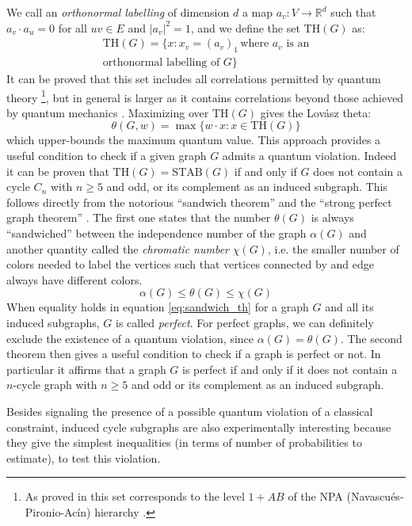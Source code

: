 \documentclass[letterpaper]{article}
\newcommand{\Real}{\mathbb{R}}
\newcommand{\STAB}{\mathrm{STAB}}
\renewcommand{\TH}{\mathrm{TH}}
\begin{document}
We call an \emph{orthonormal labelling} of dimension $d$ a map
$a_v:V \rightarrow \Real^d$ such that $a_v \cdot a_u = 0$ for all $uv \in E$ and
$|a_v|^2 = 1$, and we define the set $\TH(G)$ as:
\begin{multline}
    \TH(G) = \{x: x_v = (a_v)_1 \, \text{where $a_v$ is an} \\ \text{orthonormal labelling of $G$}\}
    \label{eq:thbody}
\end{multline}
It can be proved that this set includes all correlations permitted by quantum
theory \footnote{As proved in \cite{acin2015} this set corresponds to the level
$1+AB$ of the NPA (Navascués-Pironio-Acín) hierarchy \cite{npa2008}.}, 
but in general is larger as it contains correlations beyond those achieved by quantum
mechanics \cite{almostquantum2015}.
Maximizing over $\TH(G)$ gives the Lovász theta:
\begin{equation}
    \theta(G,w) = \max \{w\cdot x : x \in \TH(G)\}
    \label{eq:lovasztheta}
\end{equation}
which upper-bounds the maximum quantum value.
This approach provides a useful condition to check if a given graph $G$ admits a
quantum violation. Indeed it can be proven that $\TH(G) = \STAB(G)$ if and only
if $G$ does not contain a cycle $C_n$ with $n \ge 5$ and odd, or its complement
as an induced subgraph. 
This follows directly from the notorious ``sandwich theorem''\cite{knuth,lovasz} and the ``strong
perfect graph theorem'' \cite{spgth}.
The first one states that the number $\theta(G)$ is always ``sandwiched''
between the independence number of the graph $\alpha(G)$ and another quantity
called the \emph{chromatic number} $\chi(G)$, i.e. the smaller number of colors needed
to label the vertices such that vertices connected by and edge always have
different colors.
\begin{equation}
    \alpha(G) \le \theta(G) \le \chi(G)
    \label{eq:sandwich_th}
\end{equation}
When equality holds in equation \eqref{eq:sandwich_th} for a graph $G$ and all its
induced subgraphs, $G$ is called \emph{perfect}.
For perfect graphs, we can definitely exclude the existence of a quantum
violation, since $\alpha(G) = \theta(G)$.
The second theorem then gives a useful condition to check if a graph is perfect
or not.  In particular it affirms that a graph $G$ is perfect if and only if it
does not contain a $n$-cycle graph with $n\ge5$ and odd or its complement as an
induced subgraph.

Besides signaling the presence of a possible quantum violation of a classical
constraint, induced cycle subgraphs are also experimentally interesting because
they give the simplest inequalities (in terms of number of probabilities to
estimate), to test this violation.
\end{document}
